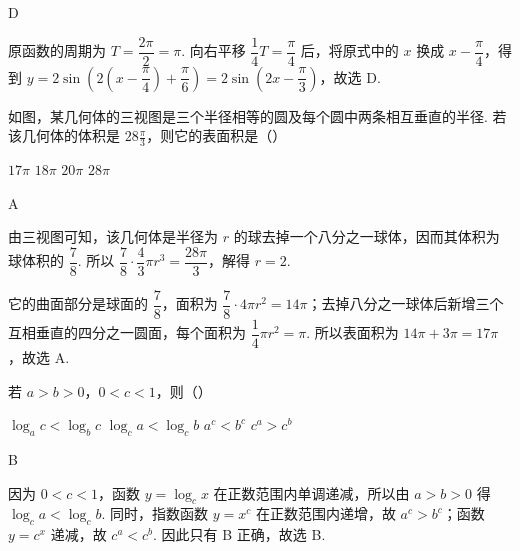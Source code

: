 \begin{answer}
D
\end{answer}

\begin{solution}
原函数的周期为 \(T=\dfrac{2\pi}{2}=\pi\). 向右平移 \(\dfrac14T=\dfrac\pi4\) 后，将原式中的 \(x\) 换成 \(x-\dfrac\pi4\)，得到 \(y=2\sin\!\left(2\left(x-\dfrac\pi4\right)+\dfrac\pi6\right)=2\sin\!\left(2x-\dfrac\pi3\right)\)，故选 D.
\end{solution}

\begin{problem}
如图，某几何体的三视图是三个半径相等的圆及每个圆中两条相互垂直的半径. 若该几何体的体积是 \(28\frac{\pi}{3}\)，则它的表面积是（\quad）


\choices
    {\(17\pi\)}
    {\(18\pi\)}
    {\(20\pi\)}
    {\(28\pi\)}
\end{problem}

\begin{answer}
A
\end{answer}

\begin{solution}
由三视图可知，该几何体是半径为 \(r\) 的球去掉一个八分之一球体，因而其体积为球体积的 \(\dfrac78\). 所以 \(\dfrac78\cdot\dfrac43\pi r^3=\dfrac{28\pi}{3}\)，解得 \(r=2\).

它的曲面部分是球面的 \(\dfrac78\)，面积为 \(\dfrac78\cdot4\pi r^2=14\pi\)；去掉八分之一球体后新增三个互相垂直的四分之一圆面，每个面积为 \(\dfrac14\pi r^2=\pi\). 所以表面积为 \(14\pi+3\pi=17\pi\)，故选 A.
\end{solution}

\begin{problem}
若 \(a>b>0\)，\(0<c<1\)，则（\quad）

\choices
    {\(\log_a c<\log_b c\)}
    {\(\log_c a<\log_c b\)}
    {\(a^c<b^c\)}
    {\(c^a>c^b\)}
\end{problem}

\begin{answer}
B
\end{answer}

\begin{solution}
因为 \(0<c<1\)，函数 \(y=\log_c x\) 在正数范围内单调递减，所以由 \(a>b>0\) 得 \(\log_c a<\log_c b\). 同时，指数函数 \(y=x^c\) 在正数范围内递增，故 \(a^c>b^c\)；函数 \(y=c^x\) 递减，故 \(c^a<c^b\). 因此只有 B 正确，故选 B.
\end{solution}

